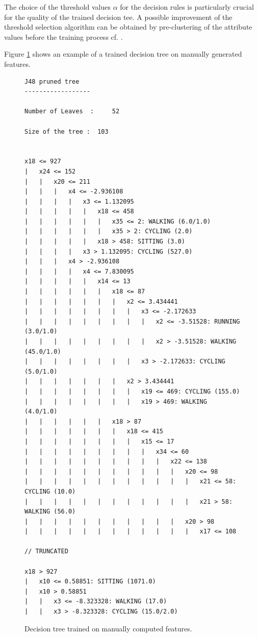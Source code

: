 The choice of the threshold values $\alpha$ for the decision rules is
particularly crucial for the quality of the trained decision tee. A
possible improvement of the threshold selection algorithm can be
obtained by pre-clustering of the attribute values before the
training process cf. \cite{kotsiantis2006}.

Figure \ref{fig:dt_example} shows an example of a trained decision
tree on manually generated features.

\begin{figure}[h]
\tiny
\centering
\begin{verbatim}
J48 pruned tree
------------------

Number of Leaves  : 	52

Size of the tree : 	103


x18 <= 927
|   x24 <= 152
|   |   x20 <= 211
|   |   |   x4 <= -2.936108
|   |   |   |   x3 <= 1.132095
|   |   |   |   |   x18 <= 458
|   |   |   |   |   |   x35 <= 2: WALKING (6.0/1.0)
|   |   |   |   |   |   x35 > 2: CYCLING (2.0)
|   |   |   |   |   x18 > 458: SITTING (3.0)
|   |   |   |   x3 > 1.132095: CYCLING (527.0)
|   |   |   x4 > -2.936108
|   |   |   |   x4 <= 7.830095
|   |   |   |   |   x14 <= 13
|   |   |   |   |   |   x18 <= 87
|   |   |   |   |   |   |   x2 <= 3.434441
|   |   |   |   |   |   |   |   x3 <= -2.172633
|   |   |   |   |   |   |   |   |   x2 <= -3.51528: RUNNING (3.0/1.0)
|   |   |   |   |   |   |   |   |   x2 > -3.51528: WALKING (45.0/1.0)
|   |   |   |   |   |   |   |   x3 > -2.172633: CYCLING (5.0/1.0)
|   |   |   |   |   |   |   x2 > 3.434441
|   |   |   |   |   |   |   |   x19 <= 469: CYCLING (155.0)
|   |   |   |   |   |   |   |   x19 > 469: WALKING (4.0/1.0)
|   |   |   |   |   |   x18 > 87
|   |   |   |   |   |   |   x18 <= 415
|   |   |   |   |   |   |   |   x15 <= 17
|   |   |   |   |   |   |   |   |   x34 <= 60
|   |   |   |   |   |   |   |   |   |   x22 <= 138
|   |   |   |   |   |   |   |   |   |   |   x20 <= 98
|   |   |   |   |   |   |   |   |   |   |   |   x21 <= 58: CYCLING (10.0)
|   |   |   |   |   |   |   |   |   |   |   |   x21 > 58: WALKING (56.0)
|   |   |   |   |   |   |   |   |   |   |   x20 > 98
|   |   |   |   |   |   |   |   |   |   |   |   x17 <= 108

// TRUNCATED

x18 > 927
|   x10 <= 0.58851: SITTING (1071.0)
|   x10 > 0.58851
|   |   x3 <= -8.323328: WALKING (17.0)
|   |   x3 > -8.323328: CYCLING (15.0/2.0)
\end{verbatim}
\normalsize
\caption{Decision tree trained on manually computed features.}
\label{fig:dt_example}
\end{figure}

